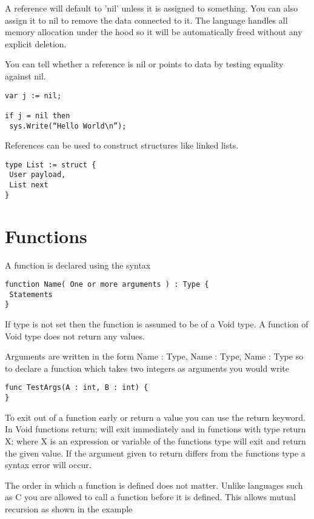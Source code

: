 \documentclass[]{final_report}
\begin{document}
A reference will default to 'nil' unless it is assigned to something. You can also assign it to nil to remove the data connected to it. The language handles all memory allocation under the hood so it will be automatically freed without any explicit deletion.

You can tell whether a reference is nil or points to data by testing equality against nil.

\begin{verbatim}
var j := nil; 

if j = nil then 
 sys.Write(“Hello World\n”);
\end{verbatim}

References can be used to construct structures like linked lists.

\begin{verbatim}
type List := struct {
 User payload,
 List next
}
\end{verbatim}


\section{Functions}

A function is declared using the syntax

\begin{verbatim}
function Name( One or more arguments ) : Type {
 Statements
}
\end{verbatim}

If type is not set then the function is assumed to be of a Void type. A function of Void type does not return any values.

Arguments are written in the form Name : Type, Name : Type, Name : Type so to declare a function which takes two integers as arguments you would write

\begin{verbatim}
func TestArgs(A : int, B : int) {
}
\end{verbatim}

To exit out of a function early or return a value you can use the return keyword. In Void functions return; will exit immediately and in functions with type return X; where X is an expression or variable of the functions type will exit and return the given value. If the argument given to return differs from the functions type a syntax error will occur.

The order in which a function is defined does not matter. Unlike languages such as C you are allowed to call a function before it is defined. This allows mutual recursion as shown in the example
\end{document}
